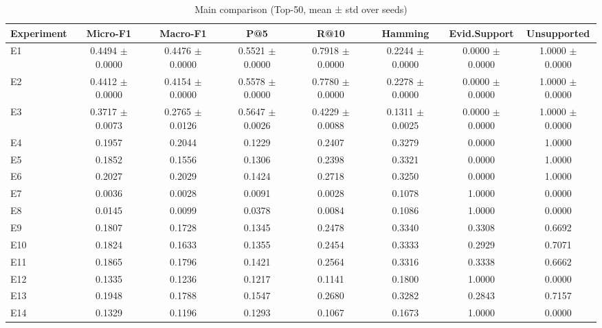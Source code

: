 \begin{table}[t]
\centering
\caption{Main comparison (Top-50, mean ± std over seeds)}
\label{tab:main}
\begin{tabular}{lccccccc}
\toprule
Experiment & Micro-F1 & Macro-F1 & P@5 & R@10 & Hamming & Evid.Support & Unsupported \\
\midrule
E1 & 0.4494 $\pm$ 0.0000 & 0.4476 $\pm$ 0.0000 & 0.5521 $\pm$ 0.0000 & 0.7918 $\pm$ 0.0000 & 0.2244 $\pm$ 0.0000 & 0.0000 $\pm$ 0.0000 & 1.0000 $\pm$ 0.0000 \\
E2 & 0.4412 $\pm$ 0.0000 & 0.4154 $\pm$ 0.0000 & 0.5578 $\pm$ 0.0000 & 0.7780 $\pm$ 0.0000 & 0.2278 $\pm$ 0.0000 & 0.0000 $\pm$ 0.0000 & 1.0000 $\pm$ 0.0000 \\
E3 & 0.3717 $\pm$ 0.0073 & 0.2765 $\pm$ 0.0126 & 0.5647 $\pm$ 0.0026 & 0.4229 $\pm$ 0.0088 & 0.1311 $\pm$ 0.0025 & 0.0000 $\pm$ 0.0000 & 1.0000 $\pm$ 0.0000 \\
E4 & 0.1957 & 0.2044 & 0.1229 & 0.2407 & 0.3279 & 0.0000 & 1.0000 \\
E5 & 0.1852 & 0.1556 & 0.1306 & 0.2398 & 0.3321 & 0.0000 & 1.0000 \\
E6 & 0.2027 & 0.2029 & 0.1424 & 0.2718 & 0.3250 & 0.0000 & 1.0000 \\
E7 & 0.0036 & 0.0028 & 0.0091 & 0.0028 & 0.1078 & 1.0000 & 0.0000 \\
E8 & 0.0145 & 0.0099 & 0.0378 & 0.0084 & 0.1086 & 1.0000 & 0.0000 \\
E9 & 0.1807 & 0.1728 & 0.1345 & 0.2478 & 0.3340 & 0.3308 & 0.6692 \\
E10 & 0.1824 & 0.1633 & 0.1355 & 0.2454 & 0.3333 & 0.2929 & 0.7071 \\
E11 & 0.1865 & 0.1796 & 0.1421 & 0.2564 & 0.3316 & 0.3338 & 0.6662 \\
E12 & 0.1335 & 0.1236 & 0.1217 & 0.1141 & 0.1800 & 1.0000 & 0.0000 \\
E13 & 0.1948 & 0.1788 & 0.1547 & 0.2680 & 0.3282 & 0.2843 & 0.7157 \\
E14 & 0.1329 & 0.1196 & 0.1293 & 0.1067 & 0.1673 & 1.0000 & 0.0000 \\
\bottomrule
\end{tabular}
\end{table}
